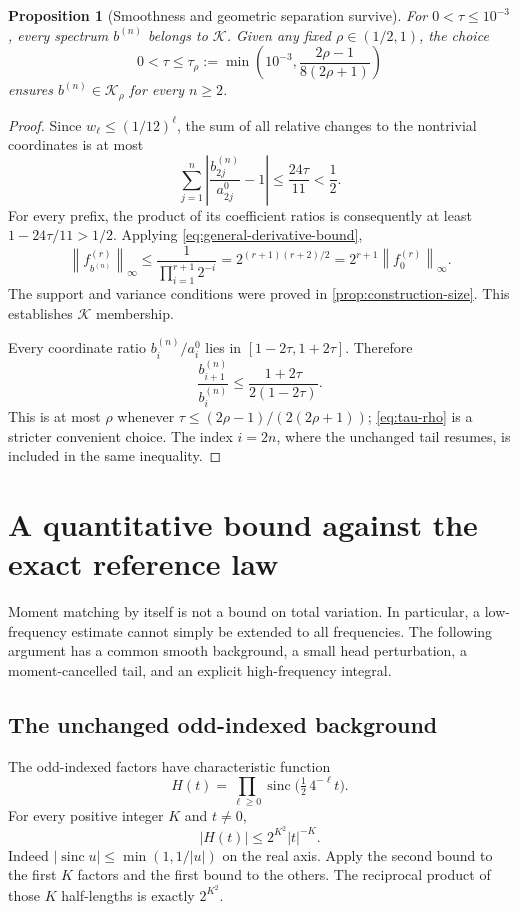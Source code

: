 \documentclass[11pt,a4paper]{article}
\numberwithin{equation}{section}
\newtheorem{proposition}[theorem]{Proposition}
\theoremstyle{definition}
\theoremstyle{remark}
\DeclareMathOperator{\sinc}{sinc}
\newcommand{\K}{\mathcal K}
\newcommand{\norm}[1]{\left\lVert #1\right\rVert}
\begin{document}
\begin{proposition}[Smoothness and geometric separation survive]
\label{prop:K-membership}
For $0<\tau\le10^{-3}$, every spectrum $b^{(n)}$ belongs to $\K$.
Given any fixed $\rho\in(1/2,1)$, the choice
\begin{equation}
 0<\tau\le\tau_\rho:=
 \min\left(10^{-3},\frac{2\rho-1}{8(2\rho+1)}\right)
 \label{eq:tau-rho}
\end{equation}
ensures $b^{(n)}\in\K_\rho$ for every $n\ge2$.
\end{proposition}
\begin{proof}
Since $w_\ell\le(1/12)^\ell$, the sum of all relative changes to the
nontrivial coordinates is at most
\[
 \sum_{j=1}^n\left|\frac{b^{(n)}_{2j}}{a^0_{2j}}-1\right|
 \le\frac{24\tau}{11}<\frac12.
\]
For every prefix, the product of its coefficient ratios is consequently at
least $1-24\tau/11>1/2$. Applying \eqref{eq:general-derivative-bound},
\[
 \norm{f_{b^{(n)}}^{(r)}}_\infty
 \le\frac1{\prod_{i=1}^{r+1}2^{-i}}
 =2^{(r+1)(r+2)/2}
 =2^{r+1}\norm{f_0^{(r)}}_\infty.
\]
The support and variance conditions were proved in
\cref{prop:construction-size}. This establishes $\K$ membership.

Every coordinate ratio $b_i^{(n)}/a_i^0$ lies in $[1-2\tau,1+2\tau]$.
Therefore
\[
 \frac{b_{i+1}^{(n)}}{b_i^{(n)}}
 \le\frac{1+2\tau}{2(1-2\tau)}.
\]
This is at most $\rho$ whenever
$\tau\le(2\rho-1)/(2(2\rho+1))$; \eqref{eq:tau-rho} is a stricter
convenient choice. The index $i=2n$, where the unchanged tail resumes,
is included in the same inequality.
\end{proof}

\section{A quantitative bound against the exact reference law}
\label{sec:fourier}

Moment matching by itself is not a bound on total variation. In particular,
a low-frequency estimate cannot simply be extended to all frequencies.
The following argument has a common smooth background, a small head
perturbation, a moment-cancelled tail, and an explicit high-frequency integral.

\subsection{The unchanged odd-indexed background}

The odd-indexed factors have characteristic function
\begin{equation}
 H(t)=\prod_{\ell\ge0}\sinc\bigl(\tfrac12\,4^{-\ell}t\bigr).
 \label{eq:odd-background}
\end{equation}
For every positive integer $K$ and $t\ne0$,
\begin{equation}
 |H(t)|\le2^{K^2}|t|^{-K}.
 \label{eq:H-bound}
\end{equation}
Indeed $|\sinc u|\le\min(1,1/|u|)$ on the real axis. Apply the second
bound to the first $K$ factors and the first bound to the others. The
reciprocal product of those $K$ half-lengths is exactly $2^{K^2}$.
\end{document}
